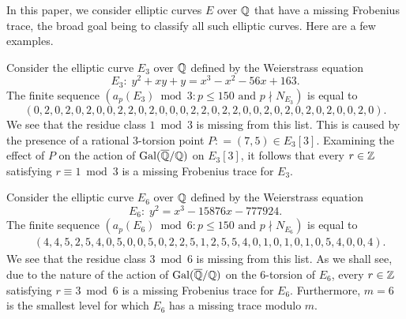 In this paper, we consider elliptic curves $E$ over $\mathbb{Q}$ that have a missing Frobenius trace, the broad goal being to classify all such elliptic curves.  Here are a few examples.
\begin{example} \label{level3example}
Consider the elliptic curve $E_3$ over $\mathbb{Q}$ defined by the Weierstrass equation
\[
E_3 \colon \; y^2 + xy + y = x^3 - x^2 - 56x + 163.
\]
The finite sequence $\left( a_p(E_{3}) \bmod 3 \colon  p \leq 150 \text{ and } p \nmid N_{E_{3}} \right)$ is equal to
\[
(0, 2, 0, 2, 0, 2, 0, 0, 2, 2, 0, 2, 0, 0, 0, 2, 2, 0, 2, 2, 0, 0, 2, 0, 2, 0, 
2, 0, 2, 0, 0, 2, 0).
\]
We see that the residue class $1 \bmod 3$ is missing from this list.  This is caused by the presence of a rational $3$-torsion point $P \colon= (7,5) \in E_3[3]$.  Examining the effect of $P$ on the action of $\operatorname{Gal}(\overline{\mathbb{Q}}/\mathbb{Q})$ on $E_3[3]$, it follows that every $r \in \mathbb{Z}$ satisfying $r \equiv 1 \bmod 3$ is a missing Frobenius trace for $E_3$.
\end{example}

\begin{example} \label{level8example}
Consider the elliptic curve $E_{6}$ over $\mathbb{Q}$ defined by the Weierstrass equation
\[
E_{6} \colon \; y^2 = x^3 - 15876x - 777924.
\]
The finite sequence $\left( a_p(E_{6}) \bmod 6 \colon  p \leq 150 \text{ and } p \nmid N_{E_{6}} \right)$ is equal to
\[
\begin{split}
&( 4, 4, 5, 2, 5, 4, 0, 5, 0, 0, 5, 0, 2, 2, 5, 1, 2, 5, 5, 4, 0, 1, 0, 1, 0, 1, 
0, 5, 4, 0, 0, 4 ).
\end{split}
\]
We see that the residue class $3 \bmod 6$ is missing from this list.  As we shall see, due to the nature of the action of $\operatorname{Gal}(\overline{\mathbb{Q}}/\mathbb{Q})$ on the $6$-torsion of $E_{6}$, every $r \in \mathbb{Z}$ satisfying $r \equiv 3 \bmod 6$ is a missing Frobenius trace for $E_6$.  Furthermore, $m=6$ is the smallest level for which $E_{6}$ has a missing trace modulo $m$.
\end{example}

